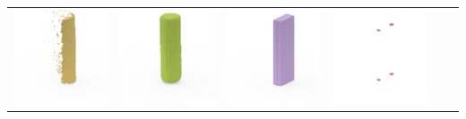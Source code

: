 \documentclass[10pt,onecolumn,letterpaper]{article}
\begin{document}
\begin{tabular}{cccccc}
\includegraphics[height=\turnheight, clip=true, trim=60 30 30 5]{pringles_bbq_NP1_312_visible_pixels_view_180.png} &
\includegraphics[height=\turnheight, clip=true, trim=60 30 30 5]{pringles_bbq_NP1_312_gt_view_180.png} &
\includegraphics[height=\turnheight, clip=true, trim=60 30 30 5]{pringles_bbq_NP1_312_bb_view_180.png} &
\includegraphics[height=\turnheight, clip=true, trim=60 30 30 5]{pringles_bbq_NP1_312_zheng_view_180.png} &

\end{tabular}
\end{document}
